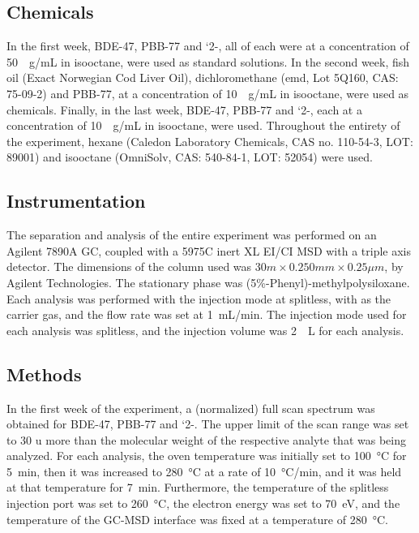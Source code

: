 \documentclass[a4paper, 12pt]{article}
\begin{document}
\subsection{Chemicals}
In the first week, BDE-47, PBB-77 and `2-, all of each were at a concentration of \SI{50}{\mu{}g/mL} in isooctane, were used as standard solutions. In the second week, fish oil (Exact Norwegian Cod Liver Oil), dichloromethane (emd, Lot 5Q160, CAS: 75-09-2) and PBB-77, at a concentration of \SI{10}{\mu{}g/mL} in isooctane, were used as chemicals. Finally, in the last week, BDE-47, PBB-77 and `2-, each at a concentration of \SI{10}{\mu{}g/mL} in isooctane, were used. Throughout the entirety of the experiment, hexane (Caledon Laboratory Chemicals, CAS no. 110-54-3, LOT: 89001) and isooctane (OmniSolv, CAS: 540-84-1, LOT: 52054) were used.

\subsection{Instrumentation}
The separation and analysis of the entire experiment was performed on an Agilent 7890A GC, coupled with a 5975C inert XL EI/CI MSD with a triple axis detector. The dimensions of the column used was $30m \times 0.250mm \times 0.25\mu{}m$, by Agilent Technologies. The stationary phase was (5\%-Phenyl)-methylpolysiloxane. Each analysis was performed with the injection mode at splitless, with  as the carrier gas, and the flow rate was set at \SI{1}{mL/min}. The injection mode used for each analysis was splitless, and the injection volume was \SI{2}{\mu{}L} for each analysis.

\subsection{Methods}
In the first week of the experiment, a (normalized) full scan spectrum was obtained for BDE-47, PBB-77 and `2-. The upper limit of the scan range was set to 30 \si{\amu} more than the molecular weight of the respective analyte that was being analyzed. For each analysis, the oven temperature was initially set to \SI{100}{\degreeCelsius} for \SI{5}{min}, then it was increased to \SI{280}{\degreeCelsius} at a rate of \SI{10}{\degreeCelsius/min}, and it was held at that temperature for \SI{7}{min}. Furthermore, the temperature of the splitless injection port was set to \SI{260}{\degreeCelsius}, the electron energy was set to \SI{70}{eV}, and the temperature of the GC-MSD interface was fixed at a temperature of \SI{280}{\degreeCelsius}.
\end{document}
